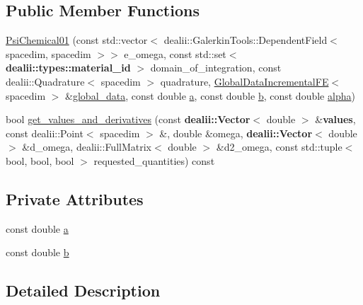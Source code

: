 \subsection*{Public Member Functions}
\begin{DoxyCompactItemize}
\item 
\hyperlink{classincremental_f_e_1_1_psi_chemical01_a5a434806969a774863983047152ecf71}{Psi\+Chemical01} (const std\+::vector$<$ dealii\+::\+Galerkin\+Tools\+::\+Dependent\+Field$<$ spacedim, spacedim $>$$>$ e\+\_\+omega, const std\+::set$<$ {\bf dealii\+::types\+::material\+\_\+id} $>$ domain\+\_\+of\+\_\+integration, const dealii\+::\+Quadrature$<$ spacedim $>$ quadrature, \hyperlink{classincremental_f_e_1_1_global_data_incremental_f_e}{Global\+Data\+Incremental\+FE}$<$ spacedim $>$ \&\hyperlink{classincremental_f_e_1_1_psi_3_01spacedim_00_01spacedim_01_4_abf0a4804877fd7cc9bd1b90e52760ba9}{global\+\_\+data}, const double \hyperlink{classincremental_f_e_1_1_psi_chemical01_a8af1cff2abb682cf14582de4a9a1bc85}{a}, const double \hyperlink{classincremental_f_e_1_1_psi_chemical01_ad445df6815f30a51be2b2443b0477871}{b}, const double \hyperlink{classincremental_f_e_1_1_psi_3_01spacedim_00_01spacedim_01_4_af7b8227188dbdd6ada35b9445d96c79d}{alpha})
\item 
bool \hyperlink{classincremental_f_e_1_1_psi_chemical01_a5455473224a9770a1f65d6418f523a39}{get\+\_\+values\+\_\+and\+\_\+derivatives} (const {\bf dealii\+::\+Vector}$<$ double $>$ \&{\bf values}, const dealii\+::\+Point$<$ spacedim $>$ \&, double \&omega, {\bf dealii\+::\+Vector}$<$ double $>$ \&d\+\_\+omega, dealii\+::\+Full\+Matrix$<$ double $>$ \&d2\+\_\+omega, const std\+::tuple$<$ bool, bool, bool $>$ requested\+\_\+quantities) const 
\end{DoxyCompactItemize}
\subsection*{Private Attributes}
\begin{DoxyCompactItemize}
\item 
const double \hyperlink{classincremental_f_e_1_1_psi_chemical01_a8af1cff2abb682cf14582de4a9a1bc85}{a}
\item 
const double \hyperlink{classincremental_f_e_1_1_psi_chemical01_ad445df6815f30a51be2b2443b0477871}{b}
\end{DoxyCompactItemize}


\subsection{Detailed Description}
